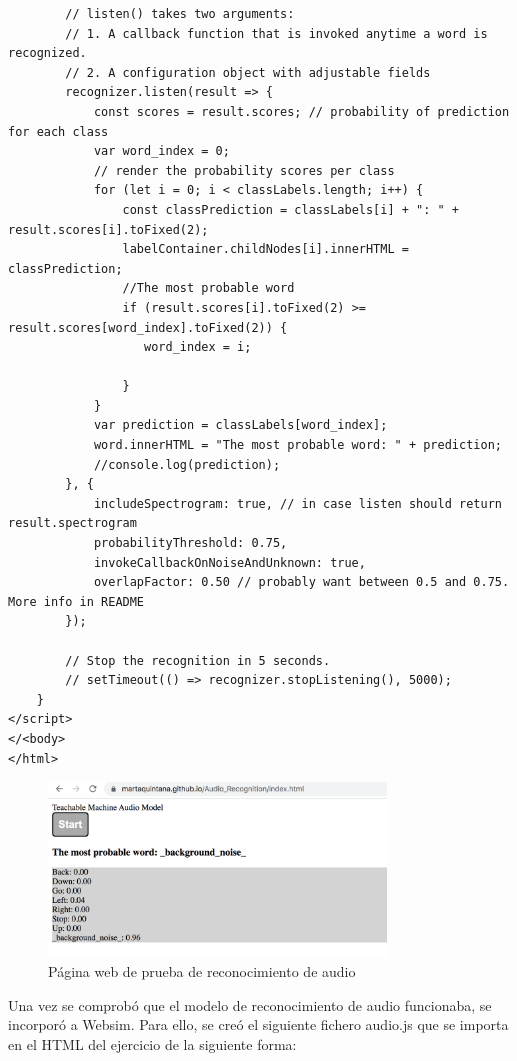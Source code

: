 \begin{lstlisting}
        // listen() takes two arguments:
        // 1. A callback function that is invoked anytime a word is recognized.
        // 2. A configuration object with adjustable fields
        recognizer.listen(result => {
            const scores = result.scores; // probability of prediction for each class
            var word_index = 0;
            // render the probability scores per class
            for (let i = 0; i < classLabels.length; i++) {
                const classPrediction = classLabels[i] + ": " + result.scores[i].toFixed(2);
                labelContainer.childNodes[i].innerHTML = classPrediction;
                //The most probable word
                if (result.scores[i].toFixed(2) >= result.scores[word_index].toFixed(2)) {
                   word_index = i;

                }
            }
            var prediction = classLabels[word_index];
            word.innerHTML = "The most probable word: " + prediction;
            //console.log(prediction);
        }, {
            includeSpectrogram: true, // in case listen should return result.spectrogram
            probabilityThreshold: 0.75,
            invokeCallbackOnNoiseAndUnknown: true,
            overlapFactor: 0.50 // probably want between 0.5 and 0.75. More info in README
        });

        // Stop the recognition in 5 seconds.
        // setTimeout(() => recognizer.stopListening(), 5000);
    }
</script>
</<body>
</html>

\end{lstlisting}


\begin{figure}[H]
    \centering
    \includegraphics[width=0.8\textwidth, height=0.4\textwidth]{chapters/images/audioprueba.png}
    \caption{Página web de prueba de reconocimiento de audio}
    \label{fig:my_label}
\end{figure}

Una vez se comprobó que el modelo de reconocimiento de audio funcionaba, se incorporó a Websim. Para ello, se creó el siguiente fichero audio.js que se importa en el HTML del ejercicio de la siguiente forma:   

